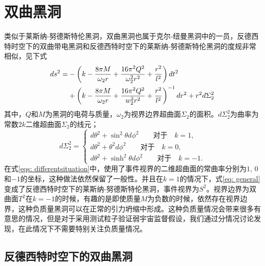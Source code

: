 \section{双曲黑洞}
类似于莱斯纳-努德斯特伦黑洞，双曲黑洞也属于克尔-纽曼黑洞中的一员，反德西特时空下的双曲带电黑洞和反德西特时空下的莱斯纳-努德斯特伦黑洞的度规非常相似，见下式\citep{cai1999topological}
\begin{align}\label{eq: general}
    ds^2=&-\left(k-\frac{8\pi M}{\omega_2 r}+\frac{16 \pi^2 Q^2}{\omega_2^2r^2}+\frac{r^2}{l^2}\right)dt^2 \notag \\
    &+\left(k-\frac{8\pi M}{\omega_2 r}+\frac{16\pi^2 Q^2}{w_2^2 r^2}+\frac{r^2}{l^2}\right)^{-1}dr^2+r^2d\Sigma_2^2
\end{align}
其中，$Q$和$M$为黑洞的电荷与质量，$\omega_2$为视界边界超曲面$\Sigma_2$的面积。$d\Sigma_2^2$为曲率为常数$2k$二维超曲面$\Sigma_2$的线元；
\begin{equation}\label{eqs: differentsituation}
    d\Sigma^2_2=\begin{cases}
        d\theta^2+\sin ^2 \theta d\phi^2 \qquad \text{对于} \quad k=1, \\
        d\theta^2+ \theta^2 d\phi^2 \qquad \text{对于} \quad k=0, \\
        d\theta^2+\sinh ^2 \theta d\phi^2 \qquad \text{对于} \quad k=-1.
    \end{cases}
\end{equation}
在式\eqref{eqs: differentsituation}中，使用了事件视界的二维超曲面的常曲率分别为$1$, $0$和$-1$的坐标，这种做法依然保留了一般性。并且在$k=1$的情况下，式\eqref{eq: general}变成了反德西特时空下的莱斯纳-努德斯特伦黑洞，事件视界为$S^2$。视界边界为双曲面$T^2$在$k=-1$的时候，有趣的是即使质量$M$为负数的时候，依然存在视界边界，这种负质量黑洞可以在正常的引力坍缩中形成\citep{mann1997black,smith1997formation}。这种负质量情况会带来很多有意思的情况，但是对于采用测试粒子验证弱宇宙监督假设，我们通过分情况讨论发现，在此情况下不需要特别关注负质量情况。

\subsection{反德西特时空下的双曲黑洞}

